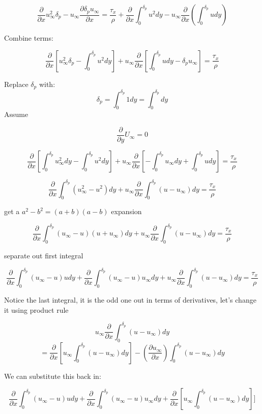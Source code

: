 \documentclass[11pt]{article}
\begin{document}
$$ \frac{\partial}{\partial x} u_\infty^2  \delta_p  -u_\infty \frac{\partial \delta_p  u_\infty}{\partial x}= \frac{\tau_x}{\rho} + \frac{\partial }{\partial x} \int_0^{\delta_p}  u^2 dy    - u_\infty\frac{\partial }{\partial x} ( \int_0^{\delta_p } u dy )   $$


Combine terms:

$$  \frac{\partial}{\partial x} [u_\infty^2  \delta_p - \int_0^{\delta_p}  u^2 dy  ]  +u_\infty \frac{\partial }{\partial x} [ \int_0^{\delta_p } u dy -\delta_p  u_\infty ] = \frac{\tau_x}{\rho}  $$

Replace $\delta_p$ with: 
$$\delta_p = \int_0^{\delta_p} 1 dy  = \int_0^{\delta_p} dy$$
Assume 

$$\frac{\partial}{\partial y } U_\infty = 0$$

$$ \frac{\partial}{\partial x} [ \int_0^{\delta_p}u_\infty^2  dy - \int_0^{\delta_p} u^2 dy  ]  +u_\infty \frac{\partial }{\partial x} [-\int_0^{\delta_p } u_\infty dy + \int_0^{\delta_p } u dy ] = \frac{\tau_x}{\rho}  $$


$$ \frac{\partial}{\partial x}   \int_0^{\delta_p} (u_\infty^2 - u^2) dy  + u_\infty \frac{\partial }{\partial x} \int_0^{\delta_p} (u -  u_\infty )dy = \frac{\tau_x}{\rho}  $$


get a $a^2-b^2 = (a+b)(a-b)$ expansion


$$ \frac{\partial}{\partial x}   \int_0^{\delta_p} ( u_\infty - u) (u+u_\infty) dy + u_\infty \frac{\partial }{\partial x} \int_0^{\delta_p} (u -  u_\infty )dy = \frac{\tau_x}{\rho}  $$

separate out first integral

$$  \frac{\partial}{\partial x}   \int_0^{\delta_p} ( u_\infty - u) u dy  + \frac{\partial}{\partial x}   \int_0^{\delta_p} ( u_\infty - u) u_\infty dy + u_\infty \frac{\partial }{\partial x} \int_0^{\delta_p} (u -  u_\infty )dy = \frac{\tau_x}{\rho}  $$

Notice the last integral, it is the odd one out in terms of derivatives, let's change it using product rule

$$ u_\infty \frac{\partial }{\partial x} \int_0^{\delta_p} (u -  u_\infty )dy $$
$$= \frac{\partial }{\partial x}[u_\infty \int_0^{\delta_p} (u -  u_\infty )dy] -( \frac{\partial u_\infty}{\partial x}) \int_0^{\delta_p} (u -  u_\infty )dy$$

We can substitute this back in:

$$  \frac{\partial}{\partial x}   \int_0^{\delta_p} ( u_\infty - u) u dy  + \frac{\partial}{\partial x}   \int_0^{\delta_p} ( u_\infty - u) u_\infty dy  +\frac{\partial }{\partial x}[u_\infty \int_0^{\delta_p} (u -  u_\infty )dy]] $$
\end{document}
